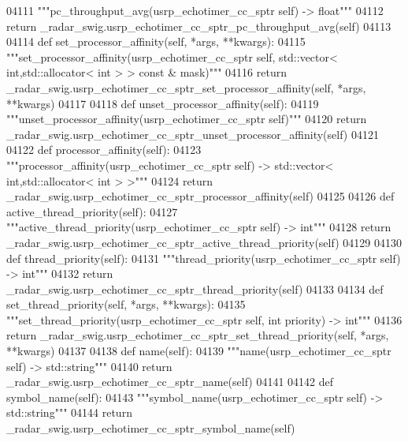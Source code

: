 \begin{DoxyCode}
{{{{{{{{{{{{{{04111         \textcolor{stringliteral}{"""pc\_throughput\_avg(usrp\_echotimer\_cc\_sptr self) -> float"""}
04112         \textcolor{keywordflow}{return} \_radar\_swig.usrp\_echotimer\_cc\_sptr\_pc\_throughput\_avg(self)
04113 
04114     \textcolor{keyword}{def }set_processor_affinity(self, *args, **kwargs):
04115         \textcolor{stringliteral}{"""set\_processor\_affinity(usrp\_echotimer\_cc\_sptr self, std::vector< int,std::allocator< int > >
       const & mask)"""}
04116         \textcolor{keywordflow}{return} \_radar\_swig.usrp\_echotimer\_cc\_sptr\_set\_processor\_affinity(self, *args, **kwargs)
04117 
04118     \textcolor{keyword}{def }unset_processor_affinity(self):
04119         \textcolor{stringliteral}{"""unset\_processor\_affinity(usrp\_echotimer\_cc\_sptr self)"""}
04120         \textcolor{keywordflow}{return} \_radar\_swig.usrp\_echotimer\_cc\_sptr\_unset\_processor\_affinity(self)
04121 
04122     \textcolor{keyword}{def }processor_affinity(self):
04123         \textcolor{stringliteral}{"""processor\_affinity(usrp\_echotimer\_cc\_sptr self) -> std::vector< int,std::allocator< int > >"""}
04124         \textcolor{keywordflow}{return} \_radar\_swig.usrp\_echotimer\_cc\_sptr\_processor\_affinity(self)
04125 
04126     \textcolor{keyword}{def }active_thread_priority(self):
04127         \textcolor{stringliteral}{"""active\_thread\_priority(usrp\_echotimer\_cc\_sptr self) -> int"""}
04128         \textcolor{keywordflow}{return} \_radar\_swig.usrp\_echotimer\_cc\_sptr\_active\_thread\_priority(self)
04129 
04130     \textcolor{keyword}{def }thread_priority(self):
04131         \textcolor{stringliteral}{"""thread\_priority(usrp\_echotimer\_cc\_sptr self) -> int"""}
04132         \textcolor{keywordflow}{return} \_radar\_swig.usrp\_echotimer\_cc\_sptr\_thread\_priority(self)
04133 
04134     \textcolor{keyword}{def }set_thread_priority(self, *args, **kwargs):
04135         \textcolor{stringliteral}{"""set\_thread\_priority(usrp\_echotimer\_cc\_sptr self, int priority) -> int"""}
04136         \textcolor{keywordflow}{return} \_radar\_swig.usrp\_echotimer\_cc\_sptr\_set\_thread\_priority(self, *args, **kwargs)
04137 
04138     \textcolor{keyword}{def }name(self):
04139         \textcolor{stringliteral}{"""name(usrp\_echotimer\_cc\_sptr self) -> std::string"""}
04140         \textcolor{keywordflow}{return} \_radar\_swig.usrp\_echotimer\_cc\_sptr\_name(self)
04141 
04142     \textcolor{keyword}{def }symbol_name(self):
04143         \textcolor{stringliteral}{"""symbol\_name(usrp\_echotimer\_cc\_sptr self) -> std::string"""}
04144         \textcolor{keywordflow}{return} \_radar\_swig.usrp\_echotimer\_cc\_sptr\_symbol\_name(self)
}}}}}}}}}}}}}}
\end{DoxyCode}
